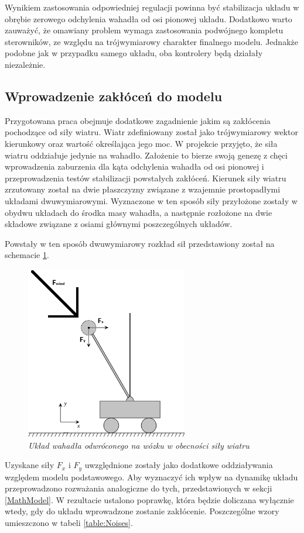 \documentclass[12pt, oneside]{report}
\theoremstyle{definition}
\begin{document}
Wynikiem zastosowania odpowiedniej regulacji powinna być stabilizacja układu w obrębie zerowego odchylenia wahadła od osi pionowej układu. Dodatkowo warto zauważyć, że omawiany problem wymaga zastosowania podwójnego kompletu sterowników, ze względu na trójwymiarowy charakter finalnego modelu. Jednakże podobne jak w przypadku samego układu, oba kontrolery będą działały niezależnie.

\subsection{Wprowadzenie zakłóceń do modelu}
Przygotowana praca obejmuje dodatkowe zagadnienie jakim są zakłócenia pochodzące od siły wiatru. Wiatr zdefiniowany został jako trójwymiarowy wektor kierunkowy oraz wartość określająca jego moc. W projekcie przyjęto, że siła wiatru oddziałuje jedynie na wahadło. Założenie to bierze swoją genezę z chęci wprowadzenia zaburzenia dla kąta odchylenia wahadła od osi pionowej i przeprowadzenia testów stabilizacji powstałych zakłóceń. Kierunek siły wiatru zrzutowany został na dwie płaszczyzny związane z wzajemnie prostopadłymi układami dwuwymiarowymi.  Wyznaczone w ten sposób siły przyłożone zostały w obydwu układach do środka masy wahadła, a następnie rozłożone na dwie składowe związane z osiami głównymi poszczególnych układów. 

Powstały w ten sposób dwuwymiarowy rozkład sił przedstawiony został na schemacie \ref{WindForce}.

\begin{figure}[H]
	\centering
		\includegraphics[width = 200pt]{WindForce} 
		\caption{\textit{Układ wahadła odwróconego na wózku w obecności siły wiatru}}
		\label{WindForce}
\end{figure}

Uzyskane siły $F_x$ i $F_y$ uwzględnione zostały jako dodatkowe oddziaływania względem modelu podstawowego. Aby wyznaczyć ich wpływ na dynamikę układu przeprowadzono rozważania analogiczne do tych, przedstawionych w sekcji \ref{MathModel}. W rezultacie ustalono poprawkę, która będzie doliczana wyłącznie wtedy, gdy do układu wprowadzone zostanie zakłócenie. Poszczególne wzory umieszczono w tabeli \ref{table:Noises}.
\end{document}
